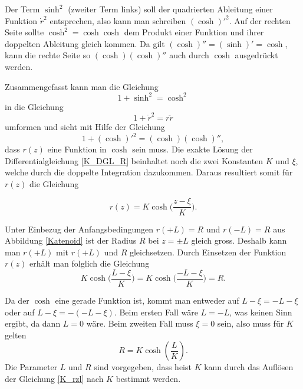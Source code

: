 \begin{refsection}
Der Term $\sinh^2$  (zweiter Term links) soll der quadrierten Ableitung einer Funktion ${\dot {r}}^2$ entsprechen, also kann man schreiben $(\cosh)'^2$. 
Auf der rechten Seite sollte $\cosh^2=\cosh \cosh$ dem Produkt einer Funktion und ihrer doppelten Ableitung gleich kommen. Da gilt $(\cosh)''=(\sinh)'=\cosh$, kann die rechte Seite so $(\cosh) (\cosh)''$ auch durch $\cosh$ ausgedrückt werden.


Zusammengefasst kann man die Gleichung 
\begin{equation} \label{K_hTrigo}
1+\sinh^2=\cosh^2
\end{equation}
 in die Gleichung 
 \begin{equation} \label{K_DGL_R2}
1+{\dot {r}}^2=r  \ddot{r}
\end{equation}
 umformen und sieht mit Hilfe der Gleichung 
\begin{equation} \label{K_hTrigoU}
1+(\cosh)'^2=(\cosh) (\cosh)'' ,
\end{equation}
dass $r(z)$ eine Funktion in $\cosh$ sein muss.
Die exakte Lösung der Differentialgleichung \eqref{K_DGL_R} beinhaltet noch die zwei Konstanten $K$ und $\xi$, welche durch die doppelte Integration dazukommen. Daraus resultiert somit für $r(z)$ die Gleichung 

\begin{equation} \label{K_r}
r(z)=K \cosh\bigg(\frac{z-\xi}{K}\bigg) .
\end{equation}

Unter Einbezug der Anfangsbedingungen $r(+L)=R$ und $r(-L)=R$ aus Abbildung \ref{Katenoid} ist der Radius $R$ bei $z= \pm L$ gleich gross. Deshalb kann man $r(+L)$ mit $r(+L)$ und $R$ gleichsetzen. Durch Einsetzen der Funktion $r(z)$ erhält man folglich die Gleichung
\begin{equation} \label{K_rL}
K \cosh\bigg(\frac{L-\xi}{K}\bigg)=K \cosh\bigg(\frac{-L-\xi}{K}\bigg)=R .
\end{equation}

Da der $\cosh$ eine gerade Funktion ist, kommt man entweder auf $L-\xi=-L-\xi$ oder auf $L-\xi=-(-L-\xi)$. 
Beim ersten Fall wäre $L=-L$, was keinen Sinn ergibt, da dann $L=0$ wäre. Beim zweiten Fall muss $\xi=0$ sein, also muss für $K$ gelten 
\begin{equation} \label{K_rzl}
R=K \cosh\left(\frac{L}{K}\right).
\end{equation}
Die Parameter $L$ und $R$ sind vorgegeben, dass heist $K$ kann durch das Auflösen der Gleichung \eqref{K_rzl} nach $K$ bestimmt werden.


\end{refsection}
